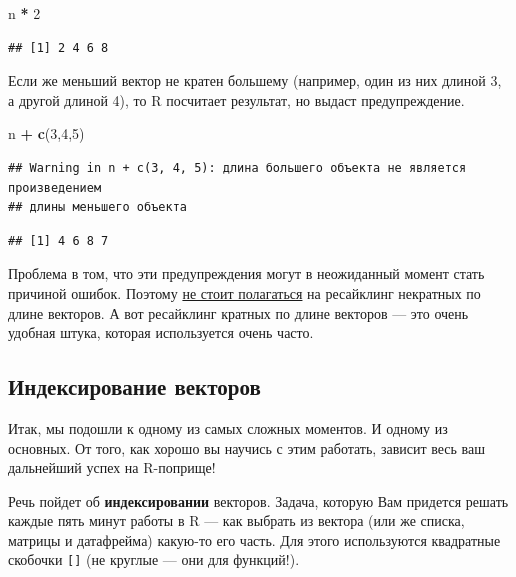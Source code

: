 \documentclass[]{book}
\newenvironment{Shaded}{\begin{snugshade}}{\end{snugshade}}
\newcommand{\KeywordTok}[1]{\textcolor[rgb]{0.13,0.29,0.53}{\textbf{#1}}}
\newcommand{\DecValTok}[1]{\textcolor[rgb]{0.00,0.00,0.81}{#1}}
\newcommand{\StringTok}[1]{\textcolor[rgb]{0.31,0.60,0.02}{#1}}
\newcommand{\OperatorTok}[1]{\textcolor[rgb]{0.81,0.36,0.00}{\textbf{#1}}}
\newcommand{\NormalTok}[1]{#1}
\begin{document}
\begin{Shaded}
\begin{Highlighting}[]
\NormalTok{n }\OperatorTok{*}\StringTok{ }\DecValTok{2}
\end{Highlighting}
\end{Shaded}

\begin{verbatim}
## [1] 2 4 6 8
\end{verbatim}

Если же меньший вектор не кратен большему (например, один из них длиной
3, а другой длиной 4), то R посчитает результат, но выдаст
предупреждение.

\begin{Shaded}
\begin{Highlighting}[]
\NormalTok{n }\OperatorTok{+}\StringTok{ }\KeywordTok{c}\NormalTok{(}\DecValTok{3}\NormalTok{,}\DecValTok{4}\NormalTok{,}\DecValTok{5}\NormalTok{)}
\end{Highlighting}
\end{Shaded}

\begin{verbatim}
## Warning in n + c(3, 4, 5): длина большего объекта не является произведением
## длины меньшего объекта
\end{verbatim}

\begin{verbatim}
## [1] 4 6 8 7
\end{verbatim}

Проблема в том, что эти предупреждения могут в неожиданный момент стать
причиной ошибок. Поэтому
\href{https://stackoverflow.com/questions/6555651/under-what-circumstances-does-r-recycle}{не
стоит полагаться} на ресайклинг некратных по длине векторов. А вот
ресайклинг кратных по длине векторов --- это очень удобная штука,
которая используется очень часто.

\subsection{Индексирование векторов}\label{index_atomic}

Итак, мы подошли к одному из самых сложных моментов. И одному из
основных. От того, как хорошо вы научись с этим работать, зависит весь
ваш дальнейший успех на R-поприще!

Речь пойдет об \textbf{индексировании} векторов. Задача, которую Вам
придется решать каждые пять минут работы в R --- как выбрать из вектора
(или же списка, матрицы и датафрейма) какую-то его часть. Для этого
используются квадратные скобочки \texttt{{[}{]}} (не круглые --- они для
функций!).
\end{document}
